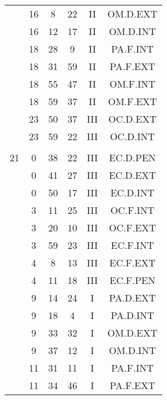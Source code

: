 \documentclass[12pt, a4paper]{article}
\begin{document}
\begin{multicols}{3}
{\begin{tabular}{c c c c c c}
	 	 	 	 & 16 & 8 & 22 & II & OM.D.EXT\\%
	 	 	 	 & 16 & 12 & 17 & II & OM.D.INT\\%
	 	 	 	 & 18 & 28 & 9 & II & PA.F.INT\\%
	 	 	 	 & 18 & 31 & 59 & II & PA.F.EXT\\%
	 	 	 	 & 18 & 55 & 47 & II & OM.F.INT\\%
	 	 	 	 & 18 & 59 & 37 & II & OM.F.EXT\\%
	 	 	 	 & 23 & 50 & 37 & III & OC.D.EXT\\%
	 	 	 	 & 23 & 59 & 22 & III & OC.D.INT\\%
	 	 	 	 & & & & & \\%
	 	 	 	21 & 0 & 38 & 22 & III & EC.D.PEN\\%
	 	 	 	 & 0 & 41 & 27 & III & EC.D.EXT\\%
	 	 	 	 & 0 & 50 & 17 & III & EC.D.INT\\%
	 	 	 	 & 3 & 11 & 25 & III & OC.F.INT\\%
	 	 	 	 & 3 & 20 & 10 & III & OC.F.EXT\\%
	 	 	 	 & 3 & 59 & 23 & III & EC.F.INT\\%
	 	 	 	 & 4 & 8 & 13 & III & EC.F.EXT\\%
	 	 	 	 & 4 & 11 & 18 & III & EC.F.PEN\\%
	 	 	 	 & 9 & 14 & 24 & I & PA.D.EXT\\%
	 	 	 	 & 9 & 18 & 4 & I & PA.D.INT\\%
	 	 	 	 & 9 & 33 & 32 & I & OM.D.EXT\\%
	 	 	 	 & 9 & 37 & 12 & I & OM.D.INT\\%
	 	 	 	 & 11 & 31 & 11 & I & PA.F.INT\\%
	 	 	 	 & 11 & 34 & 46 & I & PA.F.EXT\\%

\end{tabular}}
\end{multicols}
\end{document}

